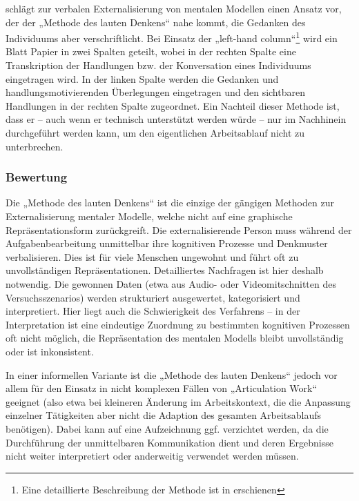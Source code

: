 \citep{Senge90} schlägt zur verbalen Externalisierung von mentalen Modellen einen Ansatz vor, der der „Methode des lauten Denkens“ nahe kommt, die Gedanken des Individuums aber verschriftlicht. Bei Einsatz der „left-hand column“\footnote{Eine detaillierte Beschreibung der Methode ist in \citep{Senge94} erschienen} wird ein Blatt Papier in zwei Spalten geteilt, wobei in der rechten Spalte eine Transkription der Handlungen bzw. der Konversation eines Individuums eingetragen wird. In der linken Spalte werden die Gedanken und handlungsmotivierenden Überlegungen eingetragen und den sichtbaren Handlungen in der rechten Spalte zugeordnet. Ein Nachteil dieser Methode ist, dass er -- auch wenn er technisch unterstützt werden würde -- nur im Nachhinein durchgeführt werden kann, um den eigentlichen Arbeitsablauf nicht zu unterbrechen.

\subsubsection{Bewertung}

Die „Methode des lauten Denkens“ \citep{Van-Someren94} ist die einzige der gängigen Methoden zur Externalisierung mentaler Modelle, welche nicht auf eine graphische Repräsentationsform zurückgreift. Die externalisierende Person muss während der Aufgabenbearbeitung unmittelbar ihre kognitiven Prozesse und Denkmuster verbalisieren. Dies ist für viele Menschen ungewohnt und führt oft zu unvollständigen Repräsentationen. Detailliertes Nachfragen ist hier deshalb notwendig. Die gewonnen Daten (etwa aus Audio- oder Videomitschnitten des Versuchsszenarios) werden strukturiert ausgewertet, kategorisiert und interpretiert. Hier liegt auch die Schwierigkeit des Verfahrens -- in der Interpretation ist eine eindeutige Zuordnung zu bestimmten kognitiven Prozessen oft nicht möglich, die Repräsentation des mentalen Modells bleibt unvollständig oder ist inkonsistent. \citet[][S. 28]{Ifenthaler06}

In einer informellen Variante ist die „Methode des lauten Denkens“ jedoch vor allem für den Einsatz in nicht komplexen Fällen von „Articulation Work“ geeignet (also etwa bei kleineren Änderung im Arbeitskontext, die die Anpassung einzelner Tätigkeiten aber nicht die Adaption des gesamten Arbeitsablaufs benötigen). Dabei kann auf eine Aufzeichnung ggf. verzichtet werden, da die Durchführung der unmittelbaren Kommunikation dient und deren Ergebnisse nicht weiter interpretiert oder anderweitig verwendet werden müssen.

